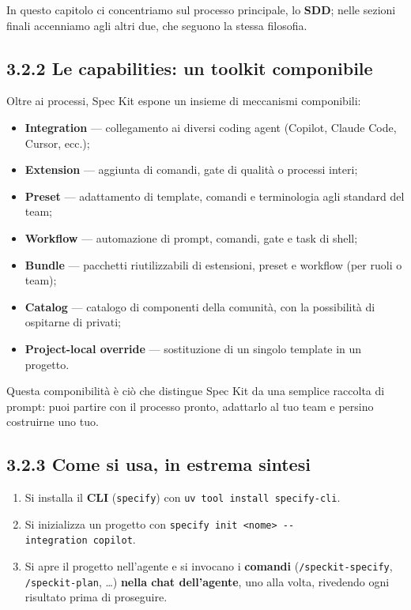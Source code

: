 \documentclass[
  italian,
  10pt,
]{book}
\providecommand{\tightlist}{%
  \setlength{\itemsep}{0pt}\setlength{\parskip}{0pt}}
\begin{document}
In questo capitolo ci concentriamo sul processo principale, lo
\textbf{SDD}; nelle sezioni finali accenniamo agli altri due, che
seguono la stessa filosofia.

\subsection{3.2.2 Le capabilities: un toolkit
componibile}\label{le-capabilities-un-toolkit-componibile}

Oltre ai processi, Spec Kit espone un insieme di meccanismi componibili:

\begin{itemize}
\tightlist
\item
  \textbf{Integration} --- collegamento ai diversi coding agent
  (Copilot, Claude Code, Cursor, ecc.);
\item
  \textbf{Extension} --- aggiunta di comandi, gate di qualità o processi
  interi;
\item
  \textbf{Preset} --- adattamento di template, comandi e terminologia
  agli standard del team;
\item
  \textbf{Workflow} --- automazione di prompt, comandi, gate e task di
  shell;
\item
  \textbf{Bundle} --- pacchetti riutilizzabili di estensioni, preset e
  workflow (per ruoli o team);
\item
  \textbf{Catalog} --- catalogo di componenti della comunità, con la
  possibilità di ospitarne di privati;
\item
  \textbf{Project-local override} --- sostituzione di un singolo
  template in un progetto.
\end{itemize}

Questa componibilità è ciò che distingue Spec Kit da una semplice
raccolta di prompt: puoi partire con il processo pronto, adattarlo al
tuo team e persino costruirne uno tuo.

\subsection{3.2.3 Come si usa, in estrema
sintesi}\label{come-si-usa-in-estrema-sintesi}

\begin{enumerate}
\def\labelenumi{\arabic{enumi}.}
\tightlist
\item
  Si installa il \textbf{CLI} (\texttt{specify}) con
  \texttt{uv\ tool\ install\ specify-cli}.
\item
  Si inizializza un progetto con
  \texttt{specify\ init\ \textless{}nome\textgreater{}\ -\/-integration\ copilot}.
\item
  Si apre il progetto nell'agente e si invocano i \textbf{comandi}
  (\texttt{/speckit-specify}, \texttt{/speckit-plan}, \ldots)
  \textbf{nella chat dell'agente}, uno alla volta, rivedendo ogni
  risultato prima di proseguire.
\end{enumerate}
\end{document}
